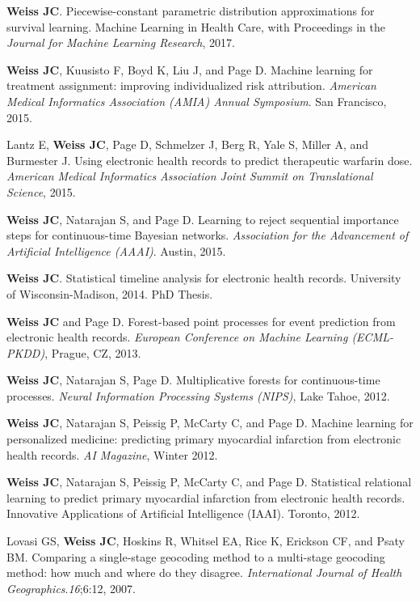 \begin{bibsection}

\item  \textbf{Weiss JC}. Piecewise-constant parametric distribution approximations for survival learning. Machine Learning in Health Care, with Proceedings in the \emph{Journal for Machine Learning Research}, 2017.

\item  \textbf{Weiss JC}, Kuusisto F, Boyd K, Liu J, and Page D. Machine learning for treatment assignment: improving individualized risk attribution. \textit{American Medical Informatics Association (AMIA) Annual Symposium}. San Francisco, 2015.

\item  Lantz E, \textbf{Weiss JC}, Page D, Schmelzer J, Berg R, Yale S, Miller A, and Burmester J. Using electronic health records to predict therapeutic warfarin dose. \textit{American Medical Informatics Association Joint Summit on Translational Science}, 2015.

\item  \textbf{Weiss JC}, Natarajan S, and Page D. Learning to reject sequential importance steps for continuous-time Bayesian networks. \textit{Association for the Advancement of Artificial Intelligence (AAAI)}. Austin, 2015.

\item  \textbf{Weiss JC}. Statistical timeline analysis for electronic health records. University of Wisconsin-Madison, 2014. PhD Thesis.

\item  \textbf{Weiss JC} and Page D. Forest-based point processes for event prediction from electronic health records. \textit{European Conference on Machine Learning (ECML-PKDD)}, Prague, CZ, 2013.

\item  \textbf{Weiss JC}, Natarajan S, Page D. Multiplicative forests for continuous-time processes. \textit{Neural Information Processing Systems (NIPS)}, Lake Tahoe, 2012.

\item  \textbf{Weiss JC}, Natarajan S, Peissig P, McCarty C, and Page D. Machine learning for personalized medicine: predicting primary myocardial infarction from electronic health records. \textit{AI Magazine}, Winter 2012.

\item  \textbf{Weiss JC}, Natarajan S, Peissig P, McCarty C, and Page D. Statistical relational learning to predict primary myocardial infarction from electronic health records. Innovative Applications of Artificial Intelligence (IAAI). Toronto, 2012.

\item  Lovasi GS, \textbf{Weiss JC}, Hoskins R, Whitsel EA, Rice K, Erickson CF, and Psaty BM. Comparing a single-stage geocoding method to a multi-stage geocoding method: how much and where do they disagree. \textit{International Journal of Health Geographics}.\textit{16};6:12, 2007.
  
\end{bibsection}

